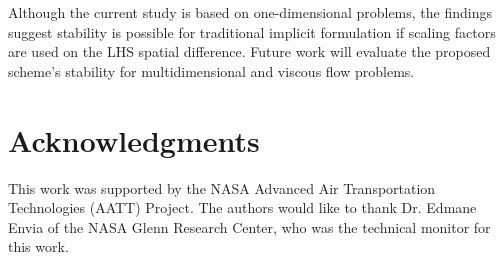 \documentclass[conf]{new-aiaa}
\begin{document}
Although the current study is based on one-dimensional problems, the findings suggest stability is possible for traditional implicit formulation if scaling factors are used on the LHS spatial difference. 
Future work will evaluate the proposed scheme's stability for multidimensional and viscous flow problems.  

\section*{Acknowledgments}
This work was supported by the NASA Advanced Air Transportation Technologies (AATT) Project. The authors would like to thank Dr. Edmane Envia of the NASA Glenn Research Center, who was the technical monitor for this work.



\end{document}
